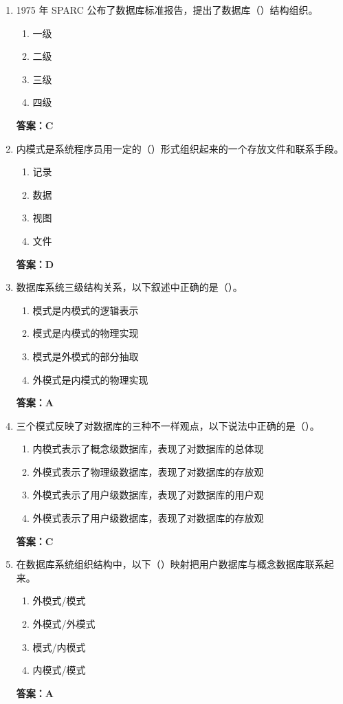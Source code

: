 \documentclass[12pt, a4paper]{article}
\begin{document}
\begin{enumerate}[label=\arabic*.]
	\item 1975 年 SPARC 公布了数据库标准报告，提出了数据库（\quad）结构组织。
	      \begin{enumerate}
		      \item 一级
		      \item 二级
		      \item 三级
		      \item 四级
	      \end{enumerate}
	      \textbf{答案：C}

	\item 内模式是系统程序员用一定的（\quad）形式组织起来的一个存放文件和联系手段。
	      \begin{enumerate}
		      \item 记录
		      \item 数据
		      \item 视图
		      \item 文件
	      \end{enumerate}
	      \textbf{答案：D}

	\item 数据库系统三级结构关系，以下叙述中正确的是（\quad）。
	      \begin{enumerate}
		      \item 模式是内模式的逻辑表示
		      \item 模式是内模式的物理实现
		      \item 模式是外模式的部分抽取
		      \item 外模式是内模式的物理实现
	      \end{enumerate}
	      \textbf{答案：A}

	\item 三个模式反映了对数据库的三种不一样观点，以下说法中正确的是（\quad）。
	      \begin{enumerate}
		      \item 内模式表示了概念级数据库，表现了对数据库的总体现
		      \item 外模式表示了物理级数据库，表现了对数据库的存放观
		      \item 外模式表示了用户级数据库，表现了对数据库的用户观
		      \item 外模式表示了用户级数据库，表现了对数据库的存放观
	      \end{enumerate}
	      \textbf{答案：C}

	\item 在数据库系统组织结构中，以下（\quad）映射把用户数据库与概念数据库联系起来。
	      \begin{enumerate}
		      \item 外模式/模式
		      \item 外模式/外模式
		      \item 模式/内模式
		      \item 内模式/模式
	      \end{enumerate}
	      \textbf{答案：A}


\end{enumerate}
\end{document}
